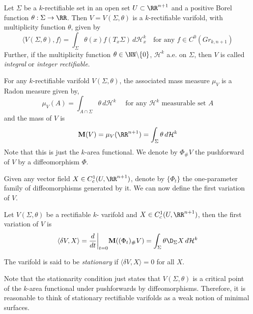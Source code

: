 \begin{defi}
Let $\Sigma$ be a $k$-rectifiable set in an open set $U \subset \RR^{n+1}$ and a positive Borel function $\theta: \Sigma \to \RR$. Then $V=V(\Sigma, \theta)$ is a $k$-rectifiable varifold, with multiplicity function $\theta$, given by 
\begin{equation*}
    \langle V(\Sigma,\theta),f \rangle = \int_{\Sigma} \theta(x) f(T_x \Sigma) \,d\mathcal{H}^k_x \quad \text{for any } f\in C^0(Gr_{k,n+1})
\end{equation*}
Further, if the multiplicity function $\theta \in \NN \backslash \{0\}$,   $\mathcal{H}^k$ a.e. on $\Sigma$, then $V$ is called \textit{integral} or \textit{integer rectifiable}. 
\end{defi} 
\begin{defi}
For any $k$-rectifiable varifold $V(\Sigma,\theta)$, the associated mass measure $\mu_V$ is a Radon measure given by,
$$ 
\mu_V(A) = \int_{A \cap \Sigma} \theta \,d\mathcal{H}^k \quad \text{ for any }\mathcal{H}^k \text{ measurable set } A 
$$
and the mass of $V$ is 
$$
\textbf{M}(V) = \mu_V(\RR^{n+1})= \int_{\Sigma} \theta \,d\mathcal{H}^k
$$
Note that this is just the $k$-area functional. We denote by $\Phi_{\#}V$ the pushforward of $V$ by a diffeomorphism $\Phi$.
\end{defi}
Given any vector field $X \in C_c^1(U, \RR^{n+1})$, denote by $\{\Phi_t\}$ the one-parameter family of diffeomorphisms generated by it. We can now define the first variation of $V$.
\begin{defi}
    Let $V(\Sigma,\theta)$ be a rectifiable $k$- varifold and $X \in C_c^1(U, \RR^{n+1})$, then the first variation of $V$ is 
    \begin{equation}\label{fvari}
      \langle \delta V , X \rangle = \frac{d}{dt}\bigg|_{t=0}\textbf{M}((\Phi_{t})_{\#}V) = \int_{\Sigma} \theta \D_{\Sigma} X \,d\mathcal{H}^k  
    \end{equation}
     
    The varifold is said to be \textit{stationary} if $\langle \delta V, X \rangle =0$ for all $X$.
\end{defi}
\begin{rem}
     Note that the stationarity condition just states that $V(\Sigma,\theta)$ is a critical point of the $k$-area functional under pushforwards by diffeomorphisms. Therefore, it is reasonable to think of stationary rectifiable varifolds as a weak notion of minimal surfaces. 
\end{rem}


